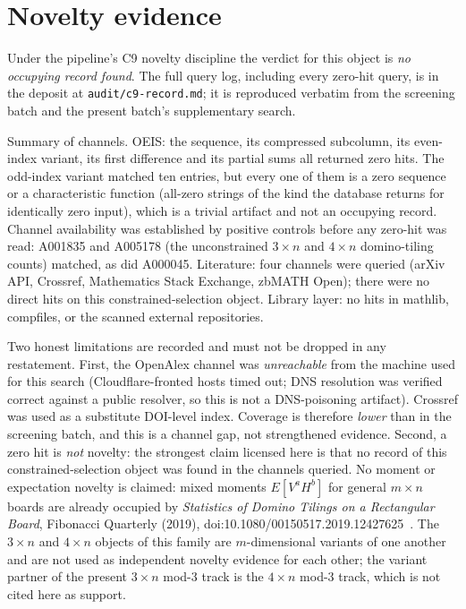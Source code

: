 \documentclass[11pt]{article}
\begin{document}
\section{Novelty evidence}
Under the pipeline's C9 novelty discipline the verdict for this object is \emph{no occupying
record found}. The full query log, including every zero-hit query, is in the deposit at
\texttt{audit/c9-record.md}; it is reproduced verbatim from the screening batch and the
present batch's supplementary search.

Summary of channels. OEIS: the sequence, its compressed subcolumn, its even-index variant,
its first difference and its partial sums all returned zero hits. The odd-index variant
matched ten entries, but every one of them is a zero sequence or a characteristic function
(all-zero strings of the kind the database returns for identically zero input), which is a
trivial artifact and not an occupying record. Channel availability was established by
positive controls before any zero-hit was read: A001835 and A005178 (the unconstrained
$3\times n$ and $4\times n$ domino-tiling counts) matched, as did A000045. Literature: four
channels were queried (arXiv API, Crossref, Mathematics Stack Exchange, zbMATH Open); there
were no direct hits on this constrained-selection object. Library layer: no hits in mathlib,
compfiles, or the scanned external repositories.

Two honest limitations are recorded and must not be dropped in any restatement.
First, the OpenAlex channel was \emph{unreachable} from the machine used for this search
(Cloudflare-fronted hosts timed out; DNS resolution was verified correct against a public
resolver, so this is not a DNS-poisoning artifact). Crossref was used as a substitute
DOI-level index. Coverage is therefore \emph{lower} than in the screening batch, and this is
a channel gap, not strengthened evidence.
Second, a zero hit is \emph{not} novelty: the strongest claim licensed here is that no
record of this constrained-selection object was found in the channels queried.
No moment or expectation novelty is claimed: mixed moments $E[V^a H^b]$ for general $m\times n$
boards are already occupied by \emph{Statistics of Domino Tilings on a Rectangular Board},
Fibonacci Quarterly (2019), doi:10.1080/00150517.2019.12427625~\cite{fq2019}.
The $3\times n$ and $4\times n$ objects of this family are $m$-dimensional variants of one
another and are not used as independent novelty evidence for each other; the variant partner
of the present $3\times n$ mod-3 track is the $4\times n$ mod-3 track, which is not cited
here as support.
\end{document}
